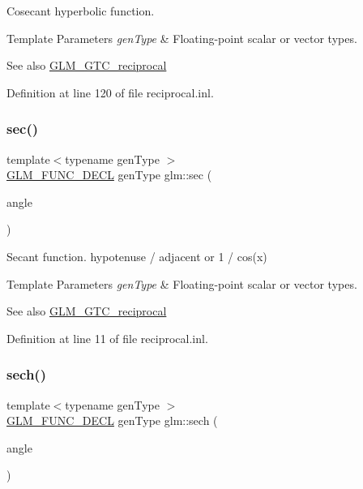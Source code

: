 Cosecant hyperbolic function.


\begin{DoxyTemplParams}{Template Parameters}
{\em gen\+Type} & Floating-\/point scalar or vector types.\\
\hline
\end{DoxyTemplParams}
\begin{DoxySeeAlso}{See also}
\mbox{\hyperlink{group__gtc__reciprocal}{G\+L\+M\+\_\+\+G\+T\+C\+\_\+reciprocal}} 
\end{DoxySeeAlso}


Definition at line 120 of file reciprocal.\+inl.

\mbox{\label{group__gtc__reciprocal_gae4bcbebee670c5ea155f0777b3acbd84}} 
\subsubsection{\texorpdfstring{sec()}{sec()}}
{\footnotesize\ttfamily template$<$typename gen\+Type $>$ \\
\mbox{\hyperlink{setup_8hpp_ab2d052de21a70539923e9bcbf6e83a51}{G\+L\+M\+\_\+\+F\+U\+N\+C\+\_\+\+D\+E\+CL}} gen\+Type glm\+::sec (\begin{DoxyParamCaption}\item[{gen\+Type}]{angle }\end{DoxyParamCaption})}

Secant function. hypotenuse / adjacent or 1 / cos(x)


\begin{DoxyTemplParams}{Template Parameters}
{\em gen\+Type} & Floating-\/point scalar or vector types.\\
\hline
\end{DoxyTemplParams}
\begin{DoxySeeAlso}{See also}
\mbox{\hyperlink{group__gtc__reciprocal}{G\+L\+M\+\_\+\+G\+T\+C\+\_\+reciprocal}} 
\end{DoxySeeAlso}


Definition at line 11 of file reciprocal.\+inl.

\mbox{\label{group__gtc__reciprocal_ga9a5cfd1e7170104a7b33863b1b75e5ae}} 
\subsubsection{\texorpdfstring{sech()}{sech()}}
{\footnotesize\ttfamily template$<$typename gen\+Type $>$ \\
\mbox{\hyperlink{setup_8hpp_ab2d052de21a70539923e9bcbf6e83a51}{G\+L\+M\+\_\+\+F\+U\+N\+C\+\_\+\+D\+E\+CL}} gen\+Type glm\+::sech (\begin{DoxyParamCaption}\item[{gen\+Type}]{angle }\end{DoxyParamCaption})}

